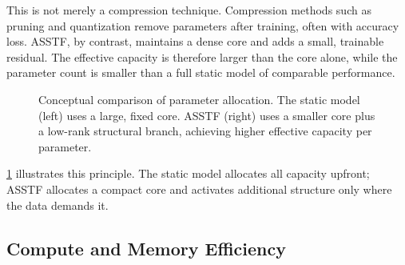 \documentclass[11pt,a4paper]{article}
\theoremstyle{definition}
\begin{document}
This is not merely a compression technique. Compression methods such as pruning and quantization remove parameters after training, often with accuracy loss. ASSTF, by contrast, maintains a dense core and adds a small, trainable residual. The effective capacity is therefore larger than the core alone, while the parameter count is smaller than a full static model of comparable performance.

\begin{figure}[t]
\centering
{}
\caption{Conceptual comparison of parameter allocation. The static model (left) uses a large, fixed core. ASSTF (right) uses a smaller core plus a low-rank structural branch, achieving higher effective capacity per parameter.}
\label{fig:param_eff}
\end{figure}

\cref{fig:param_eff} illustrates this principle. The static model allocates all capacity upfront; ASSTF allocates a compact core and activates additional structure only where the data demands it.

\subsection{Compute and Memory Efficiency}
\label{subsec:compute_eff}
\end{document}
